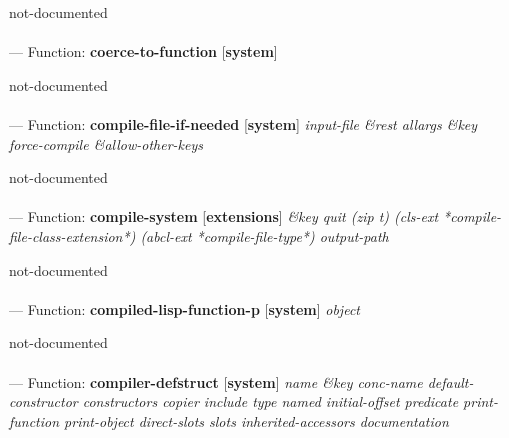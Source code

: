 \begin{adjustwidth}{5em}{5em}
not-documented
\end{adjustwidth}

\paragraph{}
\label{SYSTEM:COERCE-TO-FUNCTION}
--- Function: \textbf{coerce-to-function} [\textbf{system}] \textit{}

\begin{adjustwidth}{5em}{5em}
not-documented
\end{adjustwidth}

\paragraph{}
\label{SYSTEM:COMPILE-FILE-IF-NEEDED}
--- Function: \textbf{compile-file-if-needed} [\textbf{system}] \textit{input-file \&rest allargs \&key force-compile \&allow-other-keys}

\begin{adjustwidth}{5em}{5em}
not-documented
\end{adjustwidth}

\paragraph{}
\label{EXTENSIONS:COMPILE-SYSTEM}
--- Function: \textbf{compile-system} [\textbf{extensions}] \textit{\&key quit (zip t) (cls-ext *compile-file-class-extension*) (abcl-ext *compile-file-type*) output-path}

\begin{adjustwidth}{5em}{5em}
not-documented
\end{adjustwidth}

\paragraph{}
\label{SYSTEM:COMPILED-LISP-FUNCTION-P}
--- Function: \textbf{compiled-lisp-function-p} [\textbf{system}] \textit{object}

\begin{adjustwidth}{5em}{5em}
not-documented
\end{adjustwidth}

\paragraph{}
\label{SYSTEM:COMPILER-DEFSTRUCT}
--- Function: \textbf{compiler-defstruct} [\textbf{system}] \textit{name \&key conc-name default-constructor constructors copier include type named initial-offset predicate print-function print-object direct-slots slots inherited-accessors documentation}

